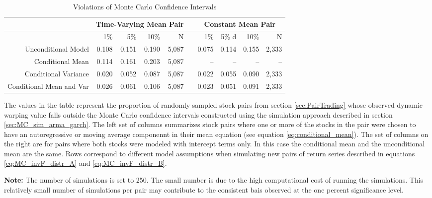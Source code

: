 \documentclass[12pt]{article}
\begin{document}
\begin{table}[!ht]
    \caption{Violations of Monte Carlo Confidence Intervals}
    \fontsize{11pt}{11pt}\selectfont
    \centering
    \begin{tabular}{r r r r r r r r r r}
        \midrule
         & \multicolumn{4}{c}{Time-Varying Mean Pair} & & \multicolumn{4}{c}{Constant Mean Pair}    \\
        \midrule
                                 & 1\%   & 5\%   & 10\%  & N     & & 1\%   & 5\%   d& 10\%  & N     \\
        Unconditional Model      & 0.108 & 0.151 & 0.190 & 5,087 & & 0.075 & 0.114 & 0.155 & 2,333 \\
        Conditional Mean         & 0.114 & 0.161 & 0.203 & 5,087 & &    -- &    -- &    -- &   --  \\
        Conditional Variance     & 0.020 & 0.052 & 0.087 & 5,087 & & 0.022 & 0.055 & 0.090 & 2,333 \\
        Conditional Mean and Var & 0.026 & 0.061 & 0.106 & 5,087 & & 0.023 & 0.051 & 0.091 & 2,333 \\
        \cmidrule{1-10}
    \end{tabular}
    \begin{tablenotes}
        \item{The values in the table represent the proportion of randomly sampled stock pairs from section \ref{sec:PairTrading} whose observed dynamic warping value falls outside the Monte Carlo confidence intervals constructed using the simulation approach described in section \ref{sec:MC_sim_arma_garch}. The left set of columns summarizes stock pairs where one or more of the stocks in the pair were chosen to have an autoregressive or moving average componennt in their mean equation (see equation \ref{eq:conditional_mean}). The set of columns on the right are for pairs where both stocks were modeled with intercept terms only. In this case the conditional mean and the unconditional mean are the same. Rows correspond to different model assumptions when simulating new pairs of return series described in equations \ref{eq:MC_invF_distr_A} and \ref{eq:MC_invF_distr_B}.}
        \item \textbf{Note:} The number of simulations is set to 250. The small number is due to the high computational cost of running the simulations. This relatively small number of simulations per pair may contribute to the consistent bais observed at the one percent significance level.
    \end{tablenotes}
    \label{tbl:monte_carlo_confidence_intervals}
\end{table}
\end{document}
